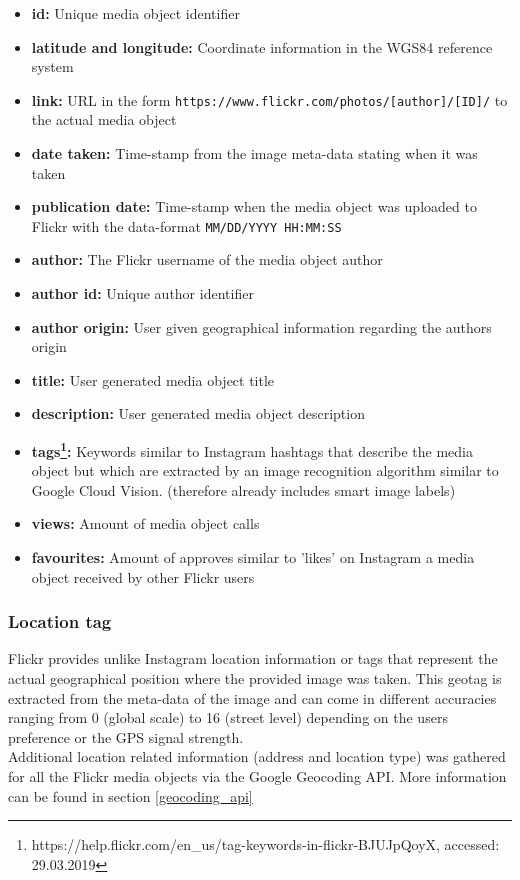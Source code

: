 \begin{itemize}[label={}]
    \item \textbf{id:} Unique media object identifier 
    \item \textbf{latitude and longitude:} Coordinate information in the WGS84 reference system 
    \item \textbf{link:} URL in the form \texttt{https://www.flickr.com/photos/[author]/[ID]/} to the actual media object 
    \item \textbf{date taken:} Time-stamp from the image meta-data stating when it was taken 
    \item \textbf{publication date:} Time-stamp when the media object was uploaded to Flickr with the data-format \texttt{MM/DD/YYYY HH:MM:SS} 
    \item \textbf{author:} The Flickr username of the media object author 
    \item \textbf{author id:} Unique author identifier  
    \item \textbf{author origin:} User given geographical information regarding the authors origin 
    \item \textbf{title:} User generated media object title 
    \item \textbf{description:} User generated media object description 
    \item \textbf{tags\footnote{https://help.flickr.com/en\_us/tag-keywords-in-flickr-BJUJpQoyX, accessed: 29.03.2019}:} Keywords similar to Instagram hashtags that describe the media object but which are extracted by an image recognition algorithm similar to Google Cloud Vision. (therefore already includes smart image labels) 
    \item \textbf{views:} Amount of media object calls 
    \item \textbf{favourites:} Amount of approves similar to 'likes' on Instagram a media object received by other Flickr users 
\end{itemize}

\subsubsection*{Location tag} \label{flickr_location_tag}
Flickr provides unlike Instagram location information or tags that represent the actual geographical position where the provided image was taken. This geotag is extracted from the meta-data of the image and can come in different accuracies ranging from 0 (global scale) to 16 (street level) depending on the users preference or the GPS signal strength. \\
Additional location related information (address and location type) was gathered for all the Flickr media objects via the Google Geocoding API. More information can be found in section \ref{geocoding_api}

